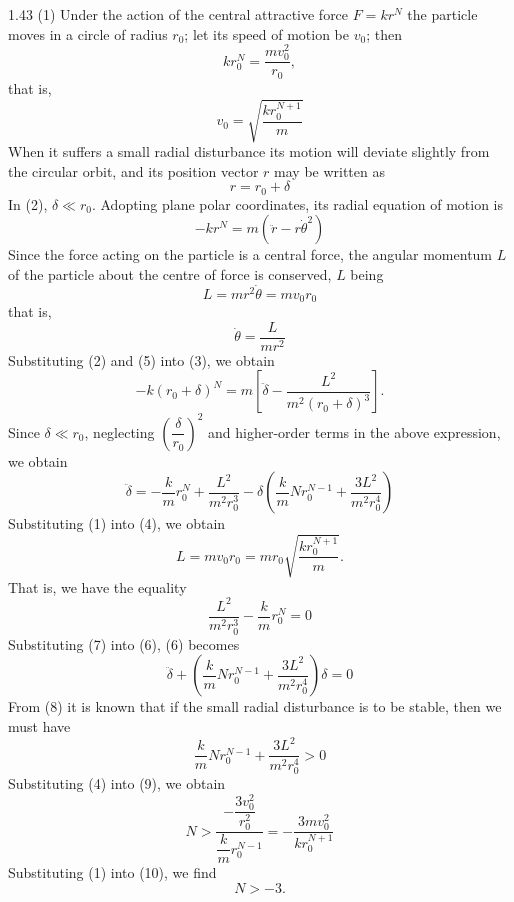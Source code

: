 \begin{solution}{1.43}
(1) Under the action of the central attractive force $F=kr^N$ the particle moves in a circle of radius $r_0$; let its speed of motion be $v_0$; then
\[
kr_0^N=\frac{mv_0^2}{r_0},
\]
that is,
\begin{equation}
v_0=\sqrt{\frac{kr_0^{N+1}}{m}} \tag{1}
\end{equation}
When it suffers a small radial disturbance its motion will deviate slightly from the circular orbit, and its position vector $r$ may be written as
\begin{equation}
r=r_0+\delta \tag{2}
\end{equation}
In (2), $\delta\ll r_0$. Adopting plane polar coordinates, its radial equation of motion is
\begin{equation}
-kr^N=m\left(\ddot r-r\dot\theta^2\right) \tag{3}
\end{equation}
Since the force acting on the particle is a central force, the angular momentum $L$ of the particle about the centre of force is conserved, $L$ being
\begin{equation}
L=mr^2\dot\theta=mv_0r_0 \tag{4}
\end{equation}
that is,
\begin{equation}
\dot\theta=\frac{L}{mr^2} \tag{5}
\end{equation}
Substituting (2) and (5) into (3), we obtain
\[
-k(r_0+\delta)^N=m\left[\ddot\delta-\frac{L^2}{m^2(r_0+\delta)^3}\right].
\]
Since $\delta\ll r_0$, neglecting $\left(\dfrac{\delta}{r_0}\right)^2$ and higher-order terms in the above expression, we obtain
\begin{equation}
\ddot\delta=-\frac{k}{m}r_0^N+\frac{L^2}{m^2r_0^3}-\delta\left(\frac{k}{m}Nr_0^{N-1}+\frac{3L^2}{m^2r_0^4}\right) \tag{6}
\end{equation}
Substituting (1) into (4), we obtain
\[
L=mv_0r_0=mr_0\sqrt{\frac{kr_0^{N+1}}{m}}.
\]
That is, we have the equality
\begin{equation}
\frac{L^2}{m^2r_0^3}-\frac{k}{m}r_0^N=0 \tag{7}
\end{equation}
Substituting (7) into (6), (6) becomes
\begin{equation}
\ddot\delta+\left(\frac{k}{m}Nr_0^{N-1}+\frac{3L^2}{m^2r_0^4}\right)\delta=0 \tag{8}
\end{equation}
From (8) it is known that if the small radial disturbance is to be stable, then we must have
\begin{equation}
\frac{k}{m}Nr_0^{N-1}+\frac{3L^2}{m^2r_0^4}>0 \tag{9}
\end{equation}
Substituting (4) into (9), we obtain
\begin{equation}
N>\frac{-\dfrac{3v_0^2}{r_0^2}}{\dfrac{k}{m}r_0^{N-1}}=-\frac{3mv_0^2}{kr_0^{N+1}} \tag{10}
\end{equation}
Substituting (1) into (10), we find
\[
N>-3.
\]


\end{solution}
